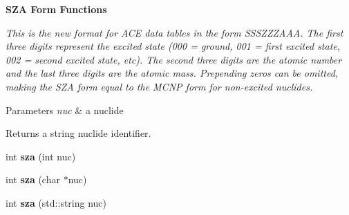\begin{Indent}{\bf S\-Z\-A Form Functions}\par
{\em This is the new format for A\-C\-E data tables in the form S\-S\-S\-Z\-Z\-Z\-A\-A\-A. The first three digits represent the excited state (000 = ground, 001 = first excited state, 002 = second excited state, etc). The second three digits are the atomic number and the last three digits are the atomic mass. Prepending zeros can be omitted, making the S\-Z\-A form equal to the M\-C\-N\-P form for non-\/excited nuclides. 
\begin{DoxyParams}{Parameters}
{\em nuc} & a nuclide \\
\hline
\end{DoxyParams}
\begin{DoxyReturn}{Returns}
a string nuclide identifier. 
\end{DoxyReturn}
}\begin{DoxyCompactItemize}
\item 
\hypertarget{namespacepyne_1_1nucname_a4e8f78a4dca435b5b7098a34fe20a76b}{int {\bfseries sza} (int nuc)}\label{namespacepyne_1_1nucname_a4e8f78a4dca435b5b7098a34fe20a76b}

\item 
\hypertarget{namespacepyne_1_1nucname_a8dceb666801fec667177459892e16fb3}{int {\bfseries sza} (char $\ast$nuc)}\label{namespacepyne_1_1nucname_a8dceb666801fec667177459892e16fb3}

\item 
\hypertarget{namespacepyne_1_1nucname_a94c67c8e183760971dfa262057a0deb4}{int {\bfseries sza} (std\-::string nuc)}\label{namespacepyne_1_1nucname_a94c67c8e183760971dfa262057a0deb4}

\end{DoxyCompactItemize}
\end{Indent}
